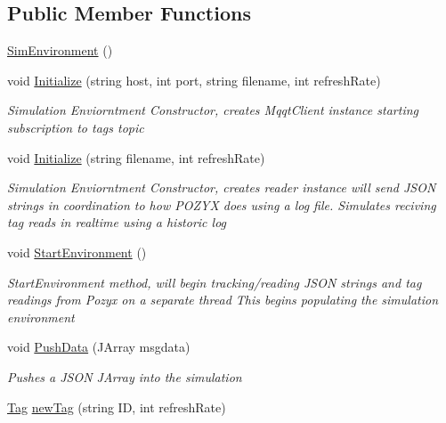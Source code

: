 \subsection*{Public Member Functions}
\begin{DoxyCompactItemize}
\item 
\hyperlink{class_pozyx_positioner_1_1_framework_1_1_sim_environment_a08b1918e1c17e7bc63dd5f92d4c70b12}{Sim\+Environment} ()
\item 
void \hyperlink{class_pozyx_positioner_1_1_framework_1_1_sim_environment_ad559e17b83e87b9121d3ffd9c08e10b4}{Initialize} (string host, int port, string filename, int refresh\+Rate)
\begin{DoxyCompactList}\small\item\em Simulation Enviorntment Constructor, creates Mqqt\+Client instance starting subscription to tags topic \end{DoxyCompactList}\item 
void \hyperlink{class_pozyx_positioner_1_1_framework_1_1_sim_environment_a7ede2b3fa6a7af26549b316f1649ba21}{Initialize} (string filename, int refresh\+Rate)
\begin{DoxyCompactList}\small\item\em Simulation Enviorntment Constructor, creates reader instance will send J\+S\+ON strings in coordination to how P\+O\+Z\+YX does using a log file. Simulates reciving tag reads in realtime using a historic log \end{DoxyCompactList}\item 
void \hyperlink{class_pozyx_positioner_1_1_framework_1_1_sim_environment_a0d114a29811d19d1376273cb078f6f61}{Start\+Environment} ()
\begin{DoxyCompactList}\small\item\em Start\+Environment method, will begin tracking/reading J\+S\+ON strings and tag readings from Pozyx on a separate thread This begins populating the simulation environment \end{DoxyCompactList}\item 
void \hyperlink{class_pozyx_positioner_1_1_framework_1_1_sim_environment_a94e341475ddb03c2c27dd253748ad65a}{Push\+Data} (J\+Array msgdata)
\begin{DoxyCompactList}\small\item\em Pushes a J\+S\+ON J\+Array into the simulation \end{DoxyCompactList}\item 
\hyperlink{class_pozyx_positioner_1_1_framework_1_1_tag}{Tag} \hyperlink{class_pozyx_positioner_1_1_framework_1_1_sim_environment_ad523ae9a258ae7b68d7f966be92ff3bb}{new\+Tag} (string ID, int refresh\+Rate)

\end{DoxyCompactItemize}
